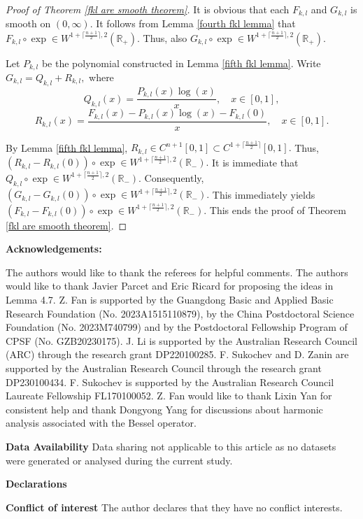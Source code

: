 \documentclass[12pt]{amsart}
\begin{document}
\begin{proof}[Proof of Theorem \ref{fkl are smooth theorem}]
It is obvious that each $F_{k,l}$ and $G_{k,l}$ is smooth on $(0,\infty).$ It follows from Lemma \ref{fourth fkl lemma} that $F_{k,l}\circ\exp\in W^{1+\lceil\frac{n+1}{2}\rceil,2}(\mathbb{R}_+).$ Thus, also $G_{k,l}\circ\exp\in W^{1+\lceil\frac{n+1}{2}\rceil,2}(\mathbb{R}_+).$

Let $P_{k,l}$ be the polynomial constructed in Lemma \ref{fifth fkl lemma}. Write $G_{k,l}=Q_{k,l}+R_{k,l},$ where
$$Q_{k,l}(x)=\frac{P_{k,l}(x)\log(x)}{x},\quad x\in [0,1],$$
$$R_{k,l}(x)=\frac{F_{k,l}(x)-P_{k,l}(x)\log(x)-F_{k,l}(0)}{x},\quad x\in [0,1].$$

By Lemma \ref{fifth fkl lemma}, $R_{k,l}\in C^{n+1}[0,1]\subset C^{1+\lceil\frac{n+1}{2}\rceil}[0,1].$ Thus, $(R_{k,l}-R_{k,l}(0))\circ\exp\in W^{1+\lceil\frac{n+1}{2}\rceil,2}(\mathbb{R}_-).$ It is immediate that $Q_{k,l}\circ\exp\in W^{1+\lceil\frac{n+1}{2}\rceil,2}(\mathbb{R}_-).$ Consequently, $(G_{k,l}-G_{k,l}(0))\circ\exp\in W^{1+\lceil\frac{n+1}{2}\rceil,2}(\mathbb{R}_-).$ This immediately yields $(F_{k,l}-F_{k,l}(0))\circ\exp\in W^{1+\lceil\frac{n+1}{2}\rceil,2}(\mathbb{R}_-).$ This ends the proof of Theorem \ref{fkl are smooth theorem}.
\end{proof}
\bigskip
{\bf Acknowledgements:}

{\color{blue}The authors would like to thank the referees for helpful comments. The authors would like to thank Javier Parcet and Eric Ricard for proposing the ideas in Lemma 4.7. }
Z. Fan is supported by the Guangdong Basic and Applied Basic Research Foundation (No. 2023A1515110879), by the China Postdoctoral Science Foundation (No. 2023M740799) and by the Postdoctoral Fellowship Program of CPSF (No. GZB20230175). J. Li is supported by the Australian Research Council (ARC) through the research grant DP220100285. F. Sukochev and D. Zanin are supported by the Australian Research Council through the research grant DP230100434. F. Sukochev is supported by the Australian Research Council Laureate Fellowship FL170100052. Z. Fan would like to thank Lixin Yan for consistent help and thank Dongyong Yang for discussions about harmonic analysis associated with {\color{blue}the Bessel operator}.

{\bf Data Availability} Data sharing not applicable to this article as no datasets
were generated or analysed during the current study.

{\bf Declarations}

{\bf Conflict of interest} The author declares that they have no conflict interests.\bigskip
\end{document}
